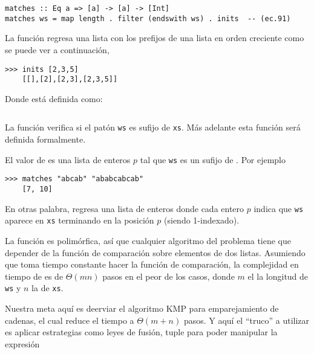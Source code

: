 \begin{verbatim}
matches :: Eq a => [a] -> [a] -> [Int]
matches ws = map length . filter (endswith ws) . inits  -- (ec.91)
\end{verbatim}


La función  regresa una lista con los prefijos de una lista en orden creciente como se 
puede ver a continuación,

\begin{verbatim}
>>> inits [2,3,5]
    [[],[2],[2,3],[2,3,5]]
\end{verbatim}

Donde  está definida como:

\inputminted{haskell}{definiciones/inits.hs}

La función  verifica si el patón \texttt{ws} es sufijo de \texttt{xs}. Más adelante esta función será definida formalmente.

El valor de  es una lista de enteros $p$ tal que \texttt{ws} es un sufijo de . Por ejemplo

\begin{verbatim}
>>> matches "abcab" "ababcabcab" 
    [7, 10]
\end{verbatim}

En otras palabra,  regresa una lista de enteros donde cada entero $p$ indica que
\texttt{ws} aparece en \texttt{xs} terminando en la posición $p$ (siendo 1-indexado).

La función  es polimórfica, así que cualquier algoritmo del problema tiene que
depender de la función de comparación  sobre elementos de dos listas.
Asumiendo que toma tiempo constante hacer la función de comparación, la complejidad en tiempo de
 es de $\Theta(mn)$ pasos en el peor de los casos, donde $m$ el la longitud de \texttt{ws} y $n$ la
de \texttt{xs}.

Nuestra meta aquí es deerviar el algoritmo KMP para emparejamiento de cadenas, el cual reduce el tiempo a $\Theta(m+n)$ pasos.
Y aquí el ``truco'' a utilizar es aplicar estrategias como leyes de fusión, tuple %
para poder manipular la expresión %

